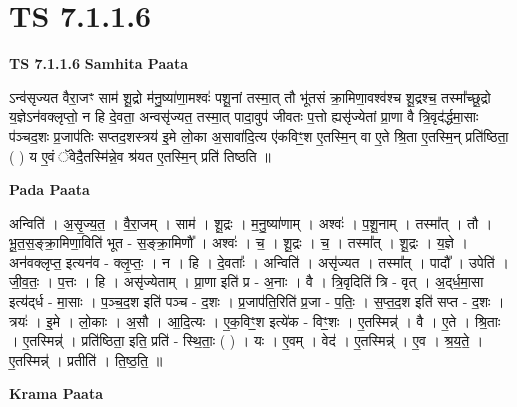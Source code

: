 \documentclass[17pt]{extarticle}
\begin{document}
\section{ TS 7.1.1.6 }

\textbf{TS 7.1.1.6 } \newline
\textbf{Samhita Paata} \newline

ऽन्व॑सृज्यत वैरा॒जꣳ साम॑ शू॒द्रो म॑नु॒ष्या॑णा॒मश्वः॑ पशू॒नां तस्मा॒त् तौ भू॑तसं क्रा॒मिणा॒वश्व॑श्च शू॒द्रश्च॒ तस्मा᳚च्छू॒द्रो य॒ज्ञेऽन॑वक्लृप्तो॒ न हि दे॒वता॒ अन्वसृ॑ज्यत॒ तस्मा॒त् पादा॒वुप॑ जीवतः प॒त्तो ह्यसृ॑ज्येतां प्रा॒णा वै त्रि॒वृद॑र्द्धमा॒साः प॑ञ्चद॒शः प्र॒जाप॑तिः सप्तद॒शस्त्रय॑ इ॒मे लो॒का अ॒सावा॑दि॒त्य ए॑कविꣳ॒॒श ए॒तस्मि॒न् वा ए॒ते श्रि॒ता ए॒तस्मि॒न् प्रति॑ष्ठिता॒ ( ) य ए॒वं ॅवेदै॒तस्मि॑न्ने॒व श्र॑यत ए॒तस्मि॒न् प्रति॑ तिष्ठति ॥ \newline

\textbf{Pada Paata} \newline

अन्विति॑ । अ॒सृ॒ज्य॒त॒ । वै॒रा॒जम् । साम॑ । शू॒द्रः । म॒नु॒ष्या॑णाम् । अश्वः॑ । प॒शू॒नाम् । तस्मा᳚त् । तौ । भू॒त॒स॒ङ्क्रा॒मिणा॒विति॑ भूत - स॒ङ्क्रा॒मिणौ᳚ । अश्वः॑ । च॒ । शू॒द्रः । च॒ । तस्मा᳚त् । शू॒द्रः । य॒ज्ञे । अन॑वक्लृप्त॒ इत्यन॑व - क्लृ॒प्तः॒ । न । हि । दे॒वताः᳚ । अन्विति॑ । असृ॑ज्यत । तस्मा᳚त् । पादौ᳚ । उपेति॑ । जी॒व॒तः॒ । प॒त्तः । हि । असृ॑ज्येताम् । प्रा॒णा इति॑ प्र - अ॒नाः । वै । त्रि॒वृदिति॑ त्रि - वृत् । अ॒द्‌र्ध॒मा॒सा इत्य॑द्‌र्ध - मा॒साः । प॒ञ्च॒द॒श इति॑ पञ्च - द॒शः । प्र॒जाप॑ति॒रिति॑ प्र॒जा - प॒तिः॒ । स॒प्त॒द॒श इति॑ सप्त - द॒शः । त्रयः॑ । इ॒मे । लो॒काः । अ॒सौ । आ॒दि॒त्यः । ए॒क॒विꣳ॒॒श इत्ये॑क - विꣳ॒॒शः । ए॒तस्मिन्न्॑ । वै । ए॒ते । श्रि॒ताः । ए॒तस्मिन्न्॑ । प्रति॑ष्ठिता॒ इति॒ प्रति॑ - स्थि॒ताः॒ ( ) । यः । ए॒वम् । वेद॑ । ए॒तस्मिन्न्॑ । ए॒व । श्र॒य॒ते॒ । ए॒तस्मिन्न्॑ । प्रतीति॑ । ति॒ष्ठ॒ति॒ ॥  \newline


\textbf{Krama Paata} \newline
\end{document}
